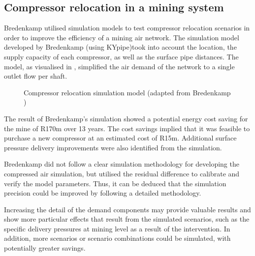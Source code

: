 \subsection{Compressor relocation in a mining system}
 Bredenkamp \cite{Bredenkamp2013Masters} utilised simulation models to test compressor relocation scenarios in order to improve the efficiency of a mining air network.  The simulation model developed by Bredenkamp (using KYpipe)took into account the location, the supply capacity of each compressor, as well as the surface pipe distances. The model, as visualised in , simplified the air demand of the network to a single outlet flow per shaft.
\par
\begin{figure}[!htbp]
	\centering
	\caption[Compressor relocation simulation model]{Compressor relocation simulation model (adapted from Bredenkamp \cite{Bredenkamp2013Masters})}
	\label{fig: bredenkamp model}
\end{figure}
The result of Bredenkamp's simulation showed a potential energy cost saving for the mine of R170m over 13 years. The cost savings implied that it was feasible to purchase a new compressor at an estimated cost of R15m. Additional surface pressure delivery improvements were also identified from the simulation.
\par 
Bredenkamp did not follow a clear simulation methodology for developing the compressed air simulation, but utilised the residual difference to calibrate and verify the model parameters. Thus, it can be deduced that the simulation precision could be improved by following a detailed methodology.
\par 
Increasing the detail of the demand components may provide valuable results and show more particular effects that result from the simulated scenarios, such as the specific delivery pressures at mining level as a result of the intervention. In addition, more scenarios or scenario combinations could be simulated, with potentially greater savings.

